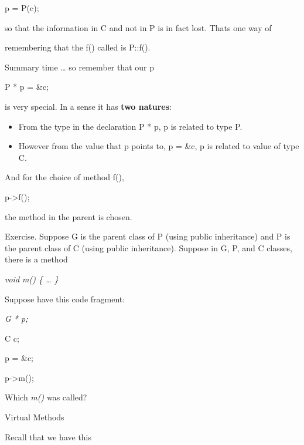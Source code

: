 \documentclass[
]{article}
\begin{document}
p = P(c);

so that the information in C and not in P is in fact lost.
That\textquotesingle s one way of

remembering that the f() called is P::f().

Summary time \ldots{} so remember that our p

P * p = \&c;

is very special. In a sense it has \textbf{two natures}:

\begin{itemize}
\item
  From the type in the declaration P * p, p is related to type P.
\item
  However from the value that p points to, p = \&c, p is related to
  value of type C.
\end{itemize}

And for the choice of method f(),

p-\textgreater f();

the method in the parent is chosen.

Exercise. Suppose G is the parent class of P (using public inheritance)
and P is the parent class of C (using public inheritance). Suppose in G,
P, and C classes, there is a method

\emph{void m() \{ \ldots{} \}}

Suppose have this code fragment:

\emph{G * p;}

C c;

p = \&c;

p-\textgreater m();

Which \emph{m()} was called?

Virtual Methods

Recall that we have this
\end{document}
